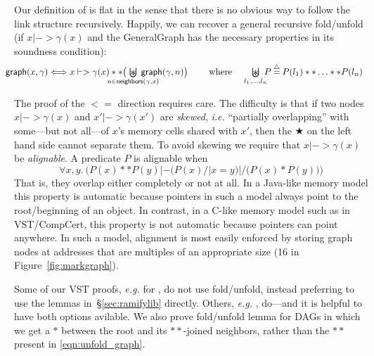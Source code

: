 Our definition of  is flat in the sense that there is no obvious way to follow the link structure recursively.  Happily, we can recover a general recursive fold/unfold (if $x |-> \gamma(x)$ and the GeneralGraph has the necessary properties in its soundness condition):
\vspace{-1ex}
\begin{equation}
\label{eqn:unfold_graph}
\hspace{-1em}\begin{array}{@{}lc@{\hspace{1pt}}c@{\hspace{1pt}}l@{}}
\p{graph}(x,\gamma)  <=>  x |-> \gamma(x) ** \big(\!\!\!\!\!\!\!\!\!\!\!\!\!\underset{n \in \p{neighbors}(\gamma,x)}{\bigocon}\!\!\!\!\!\!\!\!\!\!\!\! \p{graph}(\gamma,n) \big)
\quad \text{~~~ where ~~ }\underset{l_1,\dots,l_n}{\raisebox{-0.3ex}{\resizebox{0.75em}{!}{\hspace{0.05em}$\scon$}}\hspace{-2.18ex} \bigcup} \! \! P  \defeq  P(l_1) ** \ldots ** P(l_n) \end{array}
\vspace{-1ex}
\end{equation}

The proof of the $<=$ direction requires care. The difficulty is that if two nodes $x |-> \gamma(x)$ and $x' |-> \gamma(x')$ are \emph{skewed}, \emph{i.e.} ``partially overlapping'' with some---but not all---of $x$'s memory cells shared with $x'$, then the $\bigstar$ on the left hand side cannot separate them.  To avoid skewing we require that $x |-> \gamma(x)$ be \emph{alignable}. A predicate $P$ is alignable when
\[
\forall x,y.~ \Big(P(x) ** P(y) |- \big(P(x) /| x = y\big) |/ \big(P(x) * P(y)\big)\Big)
\]
That is, they overlap either completely or not at all. In a Java-like memory model this property is automatic because pointers in such a model always point to the root/beginning of an object.  In contrast, in a C-like memory model such as in VST/CompCert, this property is not automatic because pointers can point anywhere.  In such a model, alignment is most easily enforced by storing graph nodes at addresses that are multiples of an appropriate size (16 in Figure~\ref{fig:markgraph}).

Some of our VST proofs, \emph{e.g.} for , do not use fold/unfold, instead preferring to use the lemmas in~\S\ref{sec:ramifylib} directly.  Others, \emph{e.g.} , do---and it is helpful to have both options avilable. We also prove fold/unfold lemma for DAGs in which we get a $*$ between the root and its $**$-joined neighbors, rather than the $**$ present in \eqref{eqn:unfold_graph}.


